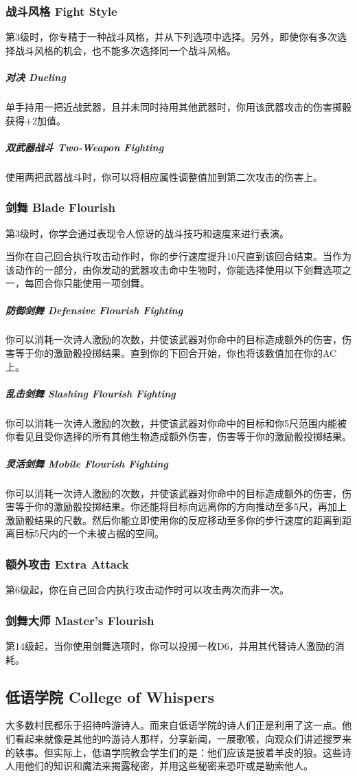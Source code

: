 \subsubsection{战斗风格 Fight Style}第3级时，你专精于一种战斗风格，并从下列选项中选择。另外，即使你有多次选择战斗风格的机会，也不能多次选择同一个战斗风格。
\subparagraph{对决 Dueling}单手持用一把近战武器，且并未同时持用其他武器时，你用该武器攻击的伤害掷骰获得+2加值。
\subparagraph{双武器战斗 Two-Weapon Fighting}
使用两把武器战斗时，你可以将相应属性调整值加到第二次攻击的伤害上。
\subsubsection{剑舞 Blade Flourish}第3级时，你学会通过表现令人惊讶的战斗技巧和速度来进行表演。

当你在自己回合执行攻击动作时，你的步行速度提升10尺直到该回合结束。当作为该动作的一部分，由你发动的武器攻击命中生物时，你能选择使用以下剑舞选项之一，每回合你只能使用一项剑舞。
\subparagraph{防御剑舞 Defensive Flourish Fighting}你可以消耗一次诗人激励的次数，并使该武器对你命中的目标造成额外的伤害，伤害等于你的激励骰投掷结果。直到你的下回合开始，你也将该数值加在你的AC上。
\subparagraph{乱击剑舞 Slashing Flourish Fighting}你可以消耗一次诗人激励的次数，并使该武器对你命中的目标和你5尺范围内能被你看见且受你选择的所有其他生物造成额外伤害，伤害等于你的激励骰投掷结果。
\subparagraph{灵活剑舞 Mobile Flourish Fighting}你可以消耗一次诗人激励的次数，并使该武器对你命中的目标造成额外的伤害，伤害等于你的激励骰投掷结果。你还能将目标向远离你的方向推动至多5尺，再加上激励骰结果的尺数。然后你能立即使用你的反应移动至多你的步行速度的距离到距离目标5尺内的一个未被占据的空间。
\subsubsection{额外攻击 Extra Attack}第6级起，你在自己回合内执行攻击动作时可以攻击两次而非一次。
\subsubsection{剑舞大师 Master's Flourish}第14级起，当你使用剑舞选项时，你可以投掷一枚D6，并用其代替诗人激励的消耗。
\subsection{低语学院 College of Whispers}大多数村民都乐于招待吟游诗人。而来自低语学院的诗人们正是利用了这一点。他们看起来就像是其他的吟游诗人那样，分享新闻，一展歌喉，向观众们讲述搜罗来的轶事。但实际上，低语学院教会学生们的是：他们应该是披着羊皮的狼。这些诗人用他们的知识和魔法来揭露秘密，并用这些秘密来恐吓或是勒索他人。

